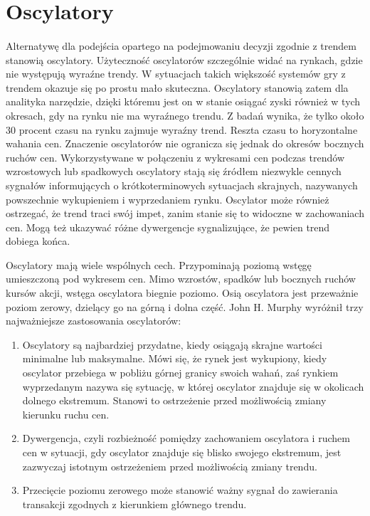 \documentclass[pdflatex,11pt]{aghdpl}
\begin{document}
\section{Oscylatory}
\label{sec:oscylatory}
\paragraph{}
Alternatywę dla podejścia opartego na podejmowaniu decyzji zgodnie z trendem stanowią oscylatory. Użyteczność oscylatorów szczególnie widać na rynkach, gdzie nie występują wyraźne trendy. W sytuacjach takich większość systemów gry z trendem okazuje się po prostu mało skuteczna. Oscylatory stanowią zatem dla analityka narzędzie, dzięki któremu jest on w stanie osiągać zyski również w tych okresach, gdy na rynku nie ma wyraźnego trendu. Z badań wynika, że tylko około 30 procent czasu na rynku zajmuje wyraźny trend. Reszta czasu to horyzontalne wahania cen. Znaczenie oscylatorów nie ogranicza się jednak do okresów bocznych ruchów cen. Wykorzystywane w połączeniu z wykresami cen podczas trendów wzrostowych lub spadkowych oscylatory stają się źródłem niezwykle cennych sygnałów informujących o krótkoterminowych sytuacjach skrajnych, nazywanych powszechnie wykupieniem i wyprzedaniem rynku\cite{5}. Oscylator może również ostrzegać, że trend traci swój impet, zanim stanie się to widoczne w zachowaniach cen. Mogą też ukazywać różne dywergencje sygnalizujące, że pewien trend dobiega końca.

Oscylatory mają wiele wspólnych cech. Przypominają poziomą wstęgę umieszczoną pod wykresem cen. Mimo wzrostów, spadków lub bocznych ruchów kursów akcji, wstęga oscylatora biegnie poziomo. Osią oscylatora jest przeważnie poziom zerowy, dzielący go na górną i dolna część. John H. Murphy wyróżnił trzy najważniejsze zastosowania oscylatorów:
\begin{enumerate}
\item Oscylatory są najbardziej przydatne, kiedy osiągają skrajne wartości minimalne lub maksymalne. Mówi się, że rynek jest wykupiony, kiedy oscylator przebiega w pobliżu górnej granicy swoich wahań, zaś rynkiem wyprzedanym nazywa się sytuację, w której oscylator znajduje się w okolicach dolnego ekstremum. Stanowi to ostrzeżenie przed możliwością zmiany kierunku ruchu cen.
\item Dywergencja, czyli rozbieżność pomiędzy zachowaniem oscylatora i ruchem cen w sytuacji, gdy oscylator znajduje się blisko swojego ekstremum, jest zazwyczaj istotnym ostrzeżeniem przed możliwością zmiany trendu.
\item Przecięcie poziomu zerowego może stanowić ważny sygnał do zawierania transakcji zgodnych z kierunkiem głównego trendu.
\end{enumerate}
\end{document}
